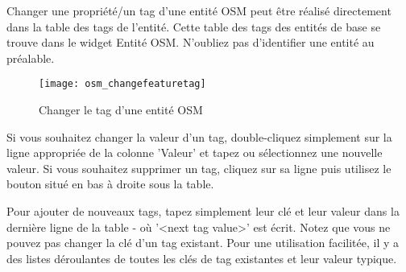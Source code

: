 Changer une propriété/un tag d'une entité OSM peut être réalisé directement dans la table des tags de l'entité. Cette table des tags des entités de base se trouve dans le widget Entité OSM. N'oubliez pas d'identifier une entité au préalable.

\begin{figure}[ht]
   \begin{center}
   \caption{Changer le tag d'une entité OSM \nixcaption}\label{fig:osmchfeattag}\smallskip
   \texttt{[image: osm\_changefeaturetag]}
\end{center}
\end{figure}

Si vous souhaitez changer la valeur d'un tag, double-cliquez simplement sur la ligne appropriée de la colonne 'Valeur' et tapez ou sélectionnez une nouvelle valeur. Si vous souhaitez supprimer un tag, cliquez sur sa ligne puis utilisez le bouton  situé en bas à droite sous la table.

Pour ajouter de nouveaux tags, tapez simplement leur clé et leur valeur dans la dernière ligne de la table - où '<next tag value>' est écrit. Notez que vous ne pouvez pas changer la clé d'un tag existant. Pour une utilisation facilitée, il y a des listes déroulantes de toutes les clés de tag existantes et leur valeur typique.


